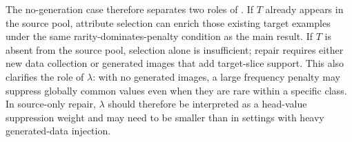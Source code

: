 The no-generation case therefore separates two roles of \model. If $T$ already appears in the source pool, attribute selection can enrich those existing target examples under the same rarity-dominates-penalty condition as the main result. If $T$ is absent from the source pool, selection alone is insufficient; repair requires either new data collection or generated images that add target-slice support. This also clarifies the role of $\lambda$: with no generated images, a large frequency penalty may suppress globally common values even when they are rare within a specific class. In source-only repair, $\lambda$ should therefore be interpreted as a head-value suppression weight and may need to be smaller than in settings with heavy generated-data injection.
